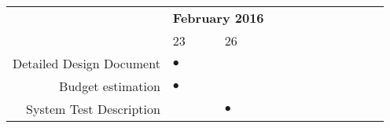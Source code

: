 \begin{tabular}{rlllllllllll}
\multicolumn{1}{c}{\textbf{}} &
\multicolumn{2}{c}{\textbf{February 2016}} \\
& 23 & 26 \\ \hline


Detailed Design Document  & $\bullet$ & \\
Budget estimation		  & $\bullet$ & \\
System Test Description   & & $\bullet$ \\

\end{tabular}

